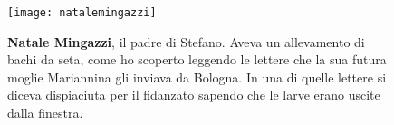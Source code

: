  \begin{figure}[htb]
    \centering
    \texttt{[image: natalemingazzi]}
    \caption[Natale Mingazzi in casa]{\textbf{Natale Mingazzi}, il padre di Stefano. Aveva un allevamento di bachi da seta, come ho scoperto leggendo le lettere che la sua futura moglie Mariannina gli inviava da Bologna. In una di quelle lettere si diceva dispiaciuta per il fidanzato sapendo che le larve erano uscite dalla finestra. \label{fig:natalemingazzi}}
\end{figure}